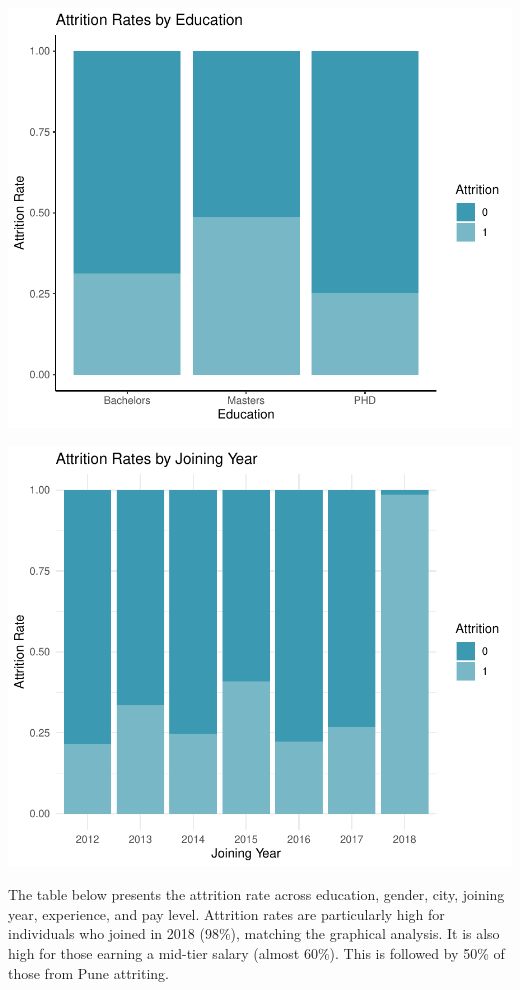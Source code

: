 \documentclass[11pt,preprint, authoryear]{elsarticle}
\numberwithin{equation}{section}
\numberwithin{figure}{section}
\numberwithin{table}{section}
\begin{document}
\includegraphics{Final_project_files/figure-latex/unnamed-chunk-7-1.pdf}

\includegraphics{Final_project_files/figure-latex/unnamed-chunk-8-1.pdf}

The table below presents the attrition rate across education, gender,
city, joining year, experience, and pay level. Attrition rates are
particularly high for individuals who joined in 2018 (98\%), matching
the graphical analysis. It is also high for those earning a mid-tier
salary (almost 60\%). This is followed by 50\% of those from Pune
attriting.
\end{document}
